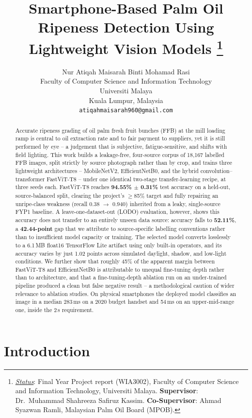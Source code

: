 \documentclass{article}
\title
{Smartphone-Based Palm Oil Ripeness Detection Using Lightweight Vision Models
\thanks{\textit{\underline{Status}}: Final Year Project report (WIA3002), Faculty of Computer Science and
Information Technology, Universiti Malaya. \textbf{Supervisor}: Dr.\ Muhammad Shahreeza Safiruz Kassim.
\textbf{Co-Supervisor}: Ahmad Syazwan Ramli, Malaysian Palm Oil Board (MPOB).}
}
\author{
Nur Atiqah Maisarah Binti Mohamad Rasi \\
Faculty of Computer Science and Information Technology \\
Universiti Malaya \\
Kuala Lumpur, Malaysia \\
\texttt{atiqahmaisarah960@gmail.com} \\
}
\begin{document}
\maketitle

\begin{abstract}
Accurate ripeness grading of oil palm fresh fruit bunches (FFB) at the mill loading ramp is central to
oil extraction rate and to fair payment to suppliers, yet it is still performed by eye -- a judgement that
is subjective, fatigue-sensitive, and shifts with field lighting. This work builds a leakage-free,
four-source corpus of 18{,}167 labelled FFB images, split strictly by source photograph rather than by
crop, and trains three lightweight architectures -- MobileNetV2, EfficientNetB0, and the hybrid
convolution--transformer FastViT-T8 -- under one identical two-stage transfer-learning recipe, at three
seeds each. FastViT-T8 reaches \textbf{94.55\% $\pm$ 0.31\%} test accuracy on a held-out, source-balanced
split, clearing the project's $\geq$85\% target and fully repairing an unripe-class weakness (recall 0.38
$\rightarrow$ 0.940) inherited from a leaky, single-source FYP1 baseline. A leave-one-dataset-out (LODO)
evaluation, however, shows this accuracy does not transfer to an entirely unseen data source: accuracy
falls to \textbf{52.11\%}, a \textbf{42.44-point} gap that we attribute to source-specific labelling
conventions rather than to insufficient model capacity or training. The selected model converts losslessly
to a 6.1\,MB float16 TensorFlow Lite artifact using only built-in operators, and its accuracy varies by
just 1.02 points across simulated daylight, shadow, and low-light conditions. We further show that roughly
45\% of the apparent margin between FastViT-T8 and EfficientNetB0 is attributable to unequal fine-tuning
depth rather than to architecture, and that a fine-tuning-depth ablation run on an under-trained pipeline
produced a clean but false negative result -- a methodological caution of wider relevance to ablation
studies. On physical smartphones the deployed model classifies an image in a median 283\,ms on a 2020 budget
handset and 54\,ms on an upper-mid-range one, inside the 2\,s requirement.
\end{abstract}


\section{Introduction}
\label{sec:intro}
\end{document}
